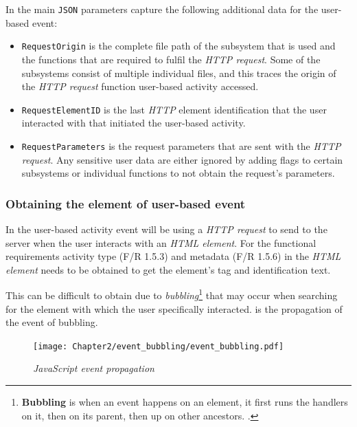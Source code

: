 In  the main \texttt{JSON} parameters capture the following additional data for the user-based event:

\begin{itemize}
	\item \texttt{RequestOrigin} is the complete file path of the subsystem that is used and the functions that are required to fulfil the \textit{HTTP request}. Some of the subsystems consist of multiple individual files, and this traces the origin of the \textit{HTTP request} function user-based activity accessed.
	\item \texttt{RequestElementID} is the last \textit{HTTP} element identification that the user interacted with that initiated the user-based activity.
	\item \texttt{RequestParameters} is the request parameters that are sent with the \textit{HTTP request}. Any sensitive user data are either ignored by adding flags to certain subsystems or individual functions to not obtain the request's parameters.
\end{itemize}

\subsubsection{Obtaining the element of user-based event}\label{sec:ch3_ElementObtaining}
In  the user-based activity event will be using a \textit{HTTP request} to send to the server when the user interacts with an \textit{HTML element}. For the functional requirements activity type (F/R 1.5.3) and metadata (F/R 1.5.6) in  the \textit{HTML element} needs to be obtained to get the element's tag and identification text.\par This can be difficult to obtain due to \textit{bubbling}\footnote{\textbf{Bubbling} is when an event happens on an element, it first runs the handlers on it, then on its parent, then up on other ancestors. \cite{EventBubbling}.} that may occur when searching for the element with which the user specifically interacted.  is the propagation of the event of bubbling.

\begin{figure}[!htb]
	\centering %
	\texttt{[image: Chapter2/event\_bubbling/event\_bubbling.pdf]}
	\caption[JavaScript event propagation]
	{\textit{JavaScript event propagation~\cite{EventBubbling}}}\label{fig:ch2_event_bubbling}
\end{figure}

